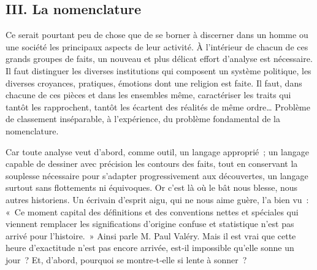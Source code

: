 \documentclass[french,twoside]{book} %
\newcommand{\astermono}{\medskip\centerline{\color{rubric}\large\selectfont{\syms ✻}}\medskip\par}%
\begin{document}
\subsection[{III. La nomenclature}]{III. La nomenclature}
\noindent Ce serait pourtant peu de chose que de se borner à discerner dans un homme ou une société les principaux aspects de leur activité. À l’in­térieur de chacun de ces grands groupes de faits, un nouveau et plus délicat effort d’analyse est nécessaire. Il faut distinguer les diverses insti­tutions qui composent un système politique, les diverses croyances, pra­tiques, émotions dont une religion est faite. Il faut, dans chacune de ces pièces et dans les ensembles même, caractériser les traits qui tantôt les rapprochent, tantôt les écartent des réalités de même ordre… Problème de classement inséparable, à l’expérience, du problème fondamental de la nomenclature.\par
Car toute analyse veut d’abord, comme outil, un langage approprié ; un langage capable de dessiner avec précision les contours des faits, tout en conservant la souplesse nécessaire pour s’adapter progressivement aux découvertes, un langage surtout sans flottements ni équivoques. Or c’est là où le bât nous blesse, nous autres historiens. Un écrivain d’esprit aigu, qui ne nous aime guère, l’a bien vu : « Ce moment capital des défi­nitions et des conventions nettes et spéciales qui viennent remplacer les significations d’origine confuse et statistique n’est pas arrivé pour l’his­toire. » Ainsi parle M. Paul Valéry. Mais il est vrai que cette heure d’exac­titude n’est pas encore arrivée, est‑il impossible qu’elle sonne un jour ? Et, d’abord, pourquoi se montre‑t‑elle si lente à sonner ?\par

\astermono
\end{document}
